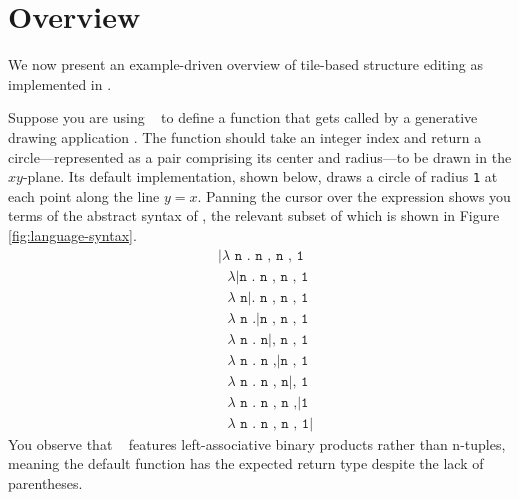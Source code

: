 \section{Overview}\label{sec:overview}






We now present an example-driven overview of tile-based
structure editing as implemented in \tylr.

Suppose you are using \tylr~ to define a function that gets called by a
generative drawing application .
The function should take an integer index and
return a circle---represented as a pair comprising
its center and radius---to be drawn in the $xy$-plane.
Its default implementation, shown below, draws a circle
of radius \texttt{1} at each point along the line $y = x$.
Panning the cursor over the expression shows you terms of
the abstract syntax of \tylr, the relevant subset of which
is shown in Figure \ref{fig:language-syntax}.
\begin{align*}
  & \texttt{|$\lambda$ n . n , n , 1} \\
  & \texttt{\ $\lambda$|n . n , n , 1} \\
  & \texttt{\ $\lambda$ n|. n , n , 1} \\
  & \texttt{\ $\lambda$ n .|n , n , 1} \\
  & \texttt{\ $\lambda$ n . n|, n , 1} \\
  & \texttt{\ $\lambda$ n . n ,|n , 1} \\
  & \texttt{\ $\lambda$ n . n , n|, 1} \\
  & \texttt{\ $\lambda$ n . n , n ,|1} \\
  & \texttt{\ $\lambda$ n . n , n , 1|}
\end{align*}
You observe that \tylr~ features left-associative binary
products rather than n-tuples, meaning the default function
has the expected return type despite the lack of parentheses.

